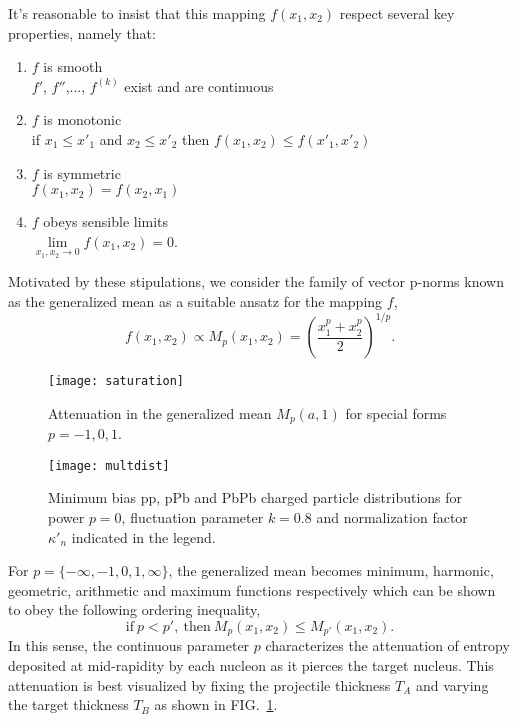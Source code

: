 \documentclass[aps,prl,reprint,amsmath,nofootinbib]{revtex4-1}
\begin{document}
It's reasonable to insist that this mapping $f(x_1,x_2)$ respect several key properties, namely that:
\begin{enumerate}
  \item{$f$ is smooth} \\
    $f'$, $f''$,..., $f^{(k)}$ exist and are continuous
  \item{$f$ is monotonic} \\
    if $x_1 \le x'_1$ and $x_2 \le x'_2$ then $f(x_1,x_2) \le f(x'_1,x'_2)$
  \item{$f$ is symmetric} \\
    $f(x_1,x_2) = f(x_2,x_1)$
  \item{$f$ obeys sensible limits} \\
    $\lim\limits_{x_1,x_2 \to 0} f(x_1,x_2) = 0$.
\end{enumerate}
Motivated by these stipulations, we consider the family of vector p-norms known as the generalized mean as a
suitable ansatz for the mapping $f$,
\begin{equation}
  \label{generalized mean ansatz}
  f(x_1, x_2) \propto M_p(x_1,x_2) = \left( \frac{x_1^p + x_2^p}{2} \right)^{1/p}.
\end{equation}

\begin{figure}[b]
  \texttt{[image: saturation]}
  \caption{\label{saturation}Attenuation in the generalized mean $M_p(a, 1)$ for special forms $p=-1, 0, 1$.}
\end{figure}

\begin{figure*}[t]
  \texttt{[image: multdist]}
  \caption{\label{fig:multdist}Minimum bias pp, pPb and PbPb charged particle distributions for power $p=0$,
  fluctuation parameter $k=0.8$ and normalization factor $\kappa'_n$ indicated in the legend.}
\end{figure*}

For $p = \{-\infty,-1,0,1,\infty\}$, the generalized mean becomes minimum, harmonic, geometric, arithmetic and
maximum functions respectively which can be shown to obey the following ordering inequality,
\begin{equation}
  \mathrm{if} ~ p<p', ~ \mathrm{then} ~ M_{p}(x_1,x_2) \le M_{p'}(x_1,x_2).
\end{equation}
In this sense, the continuous parameter $p$ characterizes the attenuation of entropy deposited at
mid-rapidity by each nucleon as it pierces the target nucleus. This attenuation is best visualized by fixing
the projectile thickness $T_A$ and varying the target thickness $T_B$ as shown in FIG.~\ref{saturation}.
\end{document}
